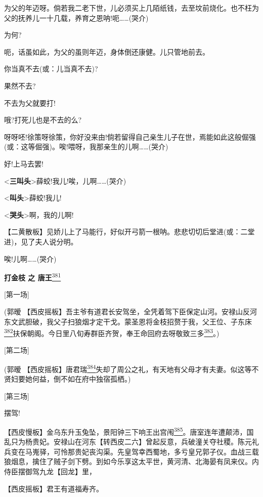 为父的年迈呀。倘若我二老下世，儿必须买上几陌纸钱，去至坟前烧化。也不枉为父的抚养儿一十几载，养育之恩呐!呃\ldots{}\ldots{}(哭介)

为何?

呃，话虽如此，为父的虽则年迈，身体倒还康健。儿只管地前去。

你当真不去(或：儿当真不去)?

果然不去?

不去为父就要打!

哦?打死儿也是不去的么?

呀呀呸!徐策呀徐策，你好没来由!倘若留得自己亲生儿子在世，焉能如此这般倔强(或：这等倔强)。唉!喂呀，我那亲生的儿啊\ldots{}\ldots{}(哭介)

好!上马去罢!

\textless{}\textbf{三叫头}\textgreater{}薛蛟!我儿!唉，儿啊\ldots{}\ldots{}(哭介)

\textless{}\textbf{叫头}\textgreater{}薛蛟!我儿!

\textless{}\textbf{哭头}\textgreater{}啊，我的儿啊!

【二黄散板】见娇儿上了马能行，好似开弓箭一根呐。悲悲切切后堂进(或：二堂进)，见了夫人说分明。

唉!儿啊\ldots{}\ldots{}(哭介)

\textbf{打金枝 之 唐王}\protect\hyperlink{fn381}{\textsuperscript{381}}

{[}第一场{]}

(郭暧
【西皮摇板】吾主爷有道君长安驾坐，全凭着驾下臣保定山河。安禄山反河东文武胆破，我父子扫狼烟才定干戈。蒙圣恩将金枝招赘于我，父王位、子东床\protect\hyperlink{fn382}{\textsuperscript{382}}扶保朝阁。今日里八旬寿群臣齐贺，奉王命回府去呀敬致三多\protect\hyperlink{fn383}{\textsuperscript{383}}。)

{[}第二场{]}

(郭暧
【西皮摇板】唐君瑞\protect\hyperlink{fn384}{\textsuperscript{384}}失却了周公之礼，有天地有父母才有夫妻。似这等不贤妇要她何益，倒不如在府中独宿孤栖。)

{[}第三场{]}

摆驾!

【西皮慢板】金乌东升玉兔坠，景阳钟三下响王出宫闱\protect\hyperlink{fn385}{\textsuperscript{385}}。唐室连年遭颠沛，国乱只为杨贵妃。安禄山在河东【转西皮二六】曾起反意，兵破潼关夺社稷。陈元礼兵变在马嵬驿，可怜那贵妃丧沟渠。先皇驾幸西蜀地，多亏皇兄郭子仪。血战三载狼烟息，擒住了贼子剑下劈。到如今乐享这太平世，黄河清、北海晏有凤来仪。内侍臣摆御驾九龙【回龙】里，

【西皮摇板】君王有道福寿齐。

